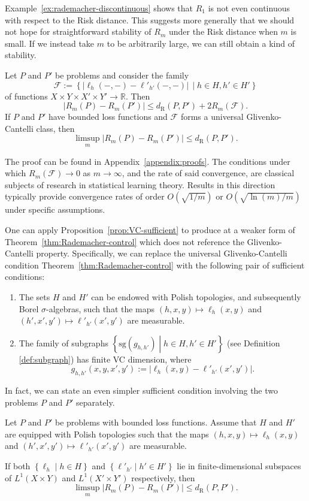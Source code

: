 \documentclass[twoside,11pt]{article}
\newcommand{\dexp}[1][]{d_{\mathrm{R}#1}}
\newcommand{\set}[2]{\left\{ #1\middle| #2\right\}}
\begin{document}
Example~\ref{ex:rademacher-discontinuous} shows that $R_1$ is not even continuous with respect to the Risk distance. This suggests more generally that we should not hope for straightforward stability of $R_m$ under the Risk distance when $m$ is small. If we instead take $m$ to be arbitrarily large, we can still obtain a kind of stability.
\begin{theorem}\label{thm:Rademacher-control}
    Let $P$ and $P'$ be problems and consider the family
    \[\mathcal F := \set{\big| \ell_h(-,-) - \ell'_{h'}(-,-) \big|\,}{h\in H, h'\in H'}\]
    of functions $X\times Y \times X' \times Y' \to \mathbb R$.
    Then \[\big|R_m(P) - R_m(P')\big| \leq \dexp(P,P') + 2R_m(\mathcal F).\]
	If $P$ and $P'$ have bounded loss functions and $\mathcal F$ forms a universal Glivenko-Cantelli class, then
    \[
    \limsup_m \big|R_m(P) - R_m(P')\big| \leq \dexp(P,P').
    \]
\end{theorem}
The proof can be found in Appendix~\ref{appendix:proofs}. The conditions under which $R_m(\mathcal F)\to 0$ as $m\to \infty$, and the rate of said convergence, are classical subjects of research in statistical learning theory. Results in this direction typically provide convergence rates of order  $O(\sqrt{1/m})$ \citep{bartlett_rademacher_2002} or $O(\sqrt{\ln(m)/m})$ \citep[Chapter 3]{mohri_foundations_2018} under specific assumptions.


One can apply Proposition~\ref{prop:VC-sufficient} to produce at a weaker form of Theorem~\ref{thm:Rademacher-control} which does not reference the Glivenko-Cantelli property. Specifically, we can replace the universal Glivenko-Cantelli condition Theorem~\ref{thm:Rademacher-control} with the following pair of sufficient conditions:
\begin{enumerate}
    \item The sets $H$ and $H'$ can be endowed with Polish topologies, and subsequently Borel $\sigma$-algebras, such that the maps $(h,x,y)\mapsto \ell_h(x,y)$ and $(h',x',y')\mapsto \ell'_{h'}(x',y')$ are measurable.
    \item The family of subgraphs $\set{\mathrm{sg}(g_{h,h'})}{h \in H, h'\in H'}$ (see Definition \ref{def:subgraph}) has finite VC dimension, where
    \[g_{h,h'}(x,y,x',y') := \big|\ell_h(x,y) - \ell'_{h'}(x',y')\big|.\]
\end{enumerate}


In fact, we can state an even simpler sufficient condition involving the two problems $P$ and $P'$ separately.
\begin{corollary}\label{cor:rademacher-control-subspace}
    Let $P$ and $P'$ be problems with bounded loss functions. Assume that $H$ and $H'$ are equipped with Polish topologies such that the maps $(h,x,y)\mapsto \ell_h(x,y)$ and $(h',x',y')\mapsto \ell'_{h'}(x',y')$ are measurable.
    
    If both $\set{\ell_h}{h\in H}$ and $\set{\ell'_{h'}}{h'\in H'}$ lie in finite-dimensional subspaces of $L^1(X\times Y)$ and $L^1(X'\times Y')$ respectively, then
    \[
    \limsup_m \big|R_m(P) - R_m(P')\big| \leq \dexp(P,P').
    \]
\end{corollary}
\end{document}

